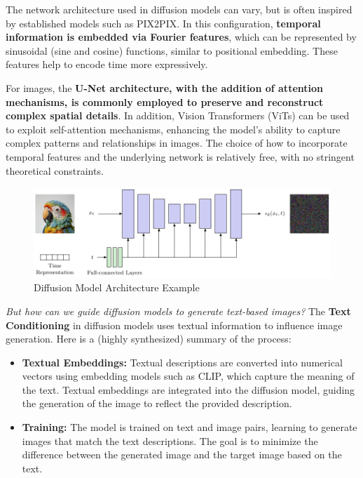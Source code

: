 The network architecture used in diffusion models can vary, but is often inspired by established models such as PIX2PIX. In this configuration, \textbf{temporal information is embedded via Fourier features}, which can be represented by sinusoidal (sine and cosine) functions, similar to positional embedding. These features help to encode time more expressively. 

For images, the \textbf{U-Net architecture, with the addition of attention mechanisms, is commonly employed to preserve and reconstruct complex spatial details}. In addition, Vision Transformers (ViTs) can be used to exploit self-attention mechanisms, enhancing the model's ability to capture complex patterns and relationships in images. The choice of how to incorporate temporal features and the underlying network is relatively free, with no stringent theoretical constraints.

\begin{figure}[!htbp]
    \centering
    \includegraphics[width=\linewidth]{tikz/chapter10 - Diffusion Models Network Architecture.pdf}
    \caption{Diffusion Model Architecture Example}
\end{figure}

\textit{But how can we guide diffusion models to generate text-based images?} The \textbf{Text Conditioning} in diffusion models uses textual information to influence image generation. Here is a (highly synthesized) summary of the process:

\begin{itemize}
    \item \textbf{Textual Embeddings:} Textual descriptions are converted into numerical vectors using embedding models such as CLIP, which capture the meaning of the text. Textual embeddings are integrated into the diffusion model, guiding the generation of the image to reflect the provided description.
    
    \item \textbf{Training:} The model is trained on text and image pairs, learning to generate images that match the text descriptions. The goal is to minimize the difference between the generated image and the target image based on the text.
\end{itemize}

